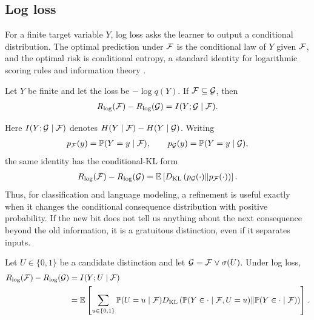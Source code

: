 \subsection{Log loss}

For a finite target variable $Y$, log loss asks the learner to output a conditional distribution. The optimal prediction under $\mathcal{F}$ is the conditional law of $Y$ given $\mathcal{F}$, and the optimal risk is conditional entropy, a standard identity for logarithmic scoring rules and information theory \citep{cover2006elements,gneiting2007strictly}.

\begin{theorem}
\label{thm:log-value:informal}
Let $Y$ be finite and let the loss be $-\log q(Y)$. If $\mathcal{F}\subseteq\mathcal{G}$, then
\begin{align*}
R_{\log}(\mathcal{F})-R_{\log}(\mathcal{G})=I(Y;\mathcal{G}\mid\mathcal{F}).
\end{align*}
\end{theorem}

Here $I(Y;\mathcal{G}\mid\mathcal{F})$ denotes $H(Y\mid\mathcal{F})-H(Y\mid\mathcal{G})$. Writing
\begin{align*}
p_{\mathcal{F}}(y)=\mathbb P(Y=y\mid\mathcal{F}),
\qquad
p_{\mathcal{G}}(y)=\mathbb P(Y=y\mid\mathcal{G}),
\end{align*}
the same identity has the conditional-KL form
\begin{align*}
R_{\log}(\mathcal{F})-R_{\log}(\mathcal{G})
=
\operatorname*{\mathbb{E}}\left[
D_{\mathrm{KL}}\left(p_{\mathcal{G}}(\cdot)\middle\|p_{\mathcal{F}}(\cdot)\right)
\right].
\end{align*}
Thus, for classification and language modeling, a refinement is useful exactly when it changes the conditional consequence distribution with positive probability. If the new bit does not tell us anything about the next consequence beyond the old information, it is a gratuitous distinction, even if it separates inputs.

\begin{corollary}
\label{cor:binary-distinction-value:informal}
Let $U\in\{0,1\}$ be a candidate distinction and let $\mathcal{G}=\mathcal{F}\vee\sigma(U)$. Under log loss,
\begin{align*}
R_{\log}(\mathcal{F})-R_{\log}(\mathcal{G})
&=
I(Y;U\mid\mathcal{F})\\
&=
\operatorname*{\mathbb{E}}\left[
\sum_{u\in\{0,1\}}
\mathbb P(U=u\mid\mathcal{F})
D_{\mathrm{KL}}\left(
\mathbb P(Y\in\cdot\mid\mathcal{F},U=u)
\middle\|
\mathbb P(Y\in\cdot\mid\mathcal{F})
\right)
\right].
\end{align*}
\end{corollary}

